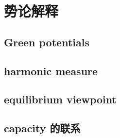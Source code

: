 \section{势论解释}
\label{b3:sec:1704}


\subsection{Green potentials}
\label{b3:subsec:170401}

\subsection{harmonic measure}
\label{b3:subsec:170402}

\subsection{equilibrium viewpoint}
\label{b3:subsec:170403}

\subsection{capacity 的联系}
\label{b3:subsec:170404}


